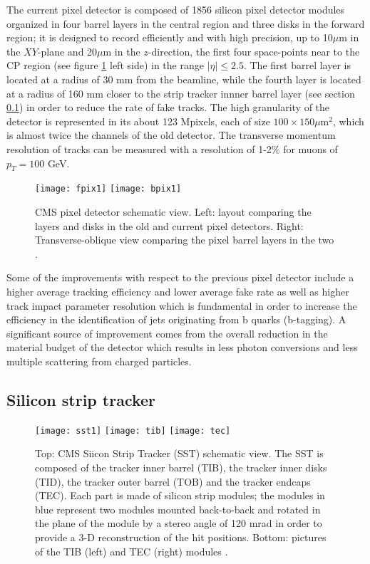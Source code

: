 \noindent  The current pixel detector is composed of 1856 silicon pixel detector modules organized in four barrel layers in the central region and three disks in the forward region; it is designed to record efficiently and with high precision, up to 10$\mu$m in the $XY$-plane and 20$\mu$m in the $z$-direction, the first four space-points near to the CP region (see figure \ref{fig:pixel_tracker} left side) in the range $|\eta|\leq 2.5$. The first barrel layer is located at a radius of 30 mm from the beamline, while the fourth layer is located at a radius of 160 mm closer to the strip tracker innner barrel layer (see section \ref{sst}) in order to reduce the rate of fake tracks. The high granularity of the detector is represented in its about 123 Mpixels, each of size $100\times150\mu$m$^2$, which is almost twice the channels of the old detector. The transverse momentum resolution of tracks can be measured with a resolution of 1-2\% for muons of $p_T=100$ GeV. \\

\begin{figure}[h!]
  \centering
  \texttt{[image: fpix1]}
  \texttt{[image: bpix1]}
  \caption[CMS pixel detector schematic view.]{CMS pixel detector schematic view. Left: layout comparing the layers and disks in the old and current pixel detectors. Right: Transverse-oblique view comparing the pixel barrel layers in the two \cite{pix_tdr}.}
  \label{fig:pixel_tracker}
\end{figure}

\noindent Some of the improvements with respect to the previous pixel detector include a higher average tracking efficiency and lower average fake rate as well as higher track impact parameter resolution which is fundamental in order to increase the efficiency in the identification of jets originating from b quarks (b-tagging). A significant source of improvement comes from the overall reduction in the material budget of the detector which results in less photon conversions and less multiple scattering from charged particles.    

\subsection{Silicon strip tracker}\label{sst}
\begin{figure}[h!]
  \centering
  \texttt{[image: sst1]}
  \texttt{[image: tib]}
  \texttt{[image: tec]}
  \caption[SST Schematic view.]{Top: CMS Siicon Strip Tracker (SST) schematic view. The SST is composed of the tracker inner barrel (TIB), the tracker inner disks (TID), the tracker outer barrel (TOB) and the tracker endcaps (TEC). Each part is made of silicon strip modules; the modules in blue represent two modules mounted back-to-back and rotated in the plane of the module by a stereo angle of 120 mrad in order to provide a 3-D reconstruction of the hit positions. Bottom: pictures of the TIB (left) and TEC (right) modules \cite{sst,tib,tec}.}
  \label{fig:sst}
\end{figure}

